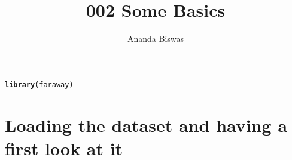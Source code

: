 \documentclass[11pt, a4paper]{article}\usepackage[]{graphicx}\usepackage[]{xcolor}
\title{002 Some Basics}
\author{Ananda Biswas}
\date{}
\makeatletter
\newcommand{\hlstd}[1]{\textcolor[rgb]{0.345,0.345,0.345}{#1}}%
\newcommand{\hlkwd}[1]{\textcolor[rgb]{0.737,0.353,0.396}{\textbf{#1}}}%
\newenvironment{kframe}{%
 \def\at@end@of@kframe{}%
 \ifinner\ifhmode%
  \def\at@end@of@kframe{\end{minipage}}%
  \begin{minipage}{\columnwidth}%
 \fi\fi%
 \def\FrameCommand##1{\hskip\@totalleftmargin \hskip-\fboxsep
 \colorbox{shadecolor}{##1}\hskip-\fboxsep
     \hskip-\linewidth \hskip-\@totalleftmargin \hskip\columnwidth}%
 \MakeFramed {\advance\hsize-\width
   \@totalleftmargin\z@ \linewidth\hsize
   \@setminipage}}%
 {\par\unskip\endMakeFramed%
 \at@end@of@kframe}
\newenvironment{knitrout}{}{} %
\makeatother
\begin{document}
\maketitle

\begin{knitrout}
\color{fgcolor}\begin{kframe}
\begin{alltt}
\hlkwd{library}\hlstd{(faraway)}
\end{alltt}


{\ttfamily\noindent\color{warningcolor}{\#\# Warning: package 'faraway' was built under R version 4.2.3}}\end{kframe}
\end{knitrout}

\section*{Loading the dataset and having a first look at it}
\end{document}

